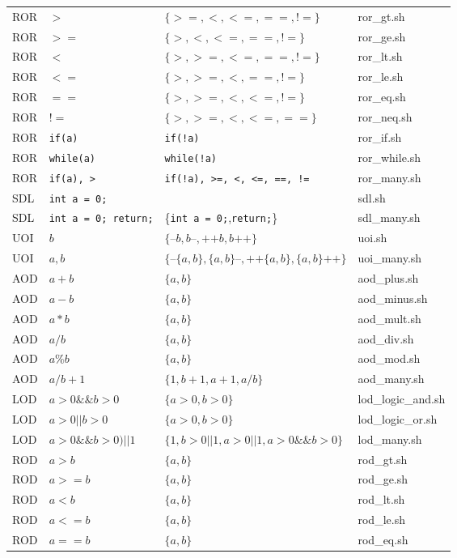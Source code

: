 \begin{table}[h]
\begin{tabular}{|llp{6cm}l|}
ROR	&	$>$	&	$\{>=, <, <=, ==, !=\}$	&	ror\_gt.sh \\
ROR	&	$>=$	&	$\{>, <, <=, ==, !=\}$	&	ror\_ge.sh \\
ROR	&	$<$	&	$\{>, >=, <=, ==, !=\}$	&	ror\_lt.sh \\
ROR	&	$<=$	&	$\{>, >=, <, ==, !=\}$	&	ror\_le.sh \\
ROR	&	$==$	&	$\{>, >=, <, <=, !=\}$	&	ror\_eq.sh \\
ROR	&	$!=$	&	$\{>, >=, <, <=, ==\}$	&	ror\_neq.sh \\
ROR	&	\texttt{if(a)}	&	\texttt{if(!a)}	&	ror\_if.sh \\
ROR	&	\texttt{while(a)}	&	\texttt{while(!a)}	&	ror\_while.sh \\
ROR	&	\texttt{if(a), >}	&	\texttt{if(!a), >=, <, <=, ==, !=}	&	ror\_many.sh \\
SDL	&	\texttt{int a = 0;} &	\texttt{}	&	sdl.sh \\
SDL	&	\texttt{int a = 0; return;} &	\{\texttt{int a = 0;},\texttt{return;}\}	&	sdl\_many.sh \\
UOI	&	$b$	&	$\{\texttt{--}b, b\texttt{--}, \texttt{++}b, b\texttt{++}\}$	&	uoi.sh \\
UOI	&	$a,b$	&	$\{\texttt{--}\{a,b\}, \{a,b\}\texttt{--}, \texttt{++}\{a,b\}, \{a,b\}\texttt{++}\}$	&	uoi\_many.sh \\
AOD	&	$a + b$	&	$\{a, b\}$	&	aod\_plus.sh \\
AOD	&	$a - b$	&	$\{a, b\}$	&	aod\_minus.sh \\
AOD	&	$a * b$	&	$\{a, b\}$	&	aod\_mult.sh \\
AOD	&	$a / b$	&	$\{a, b\}$	&	aod\_div.sh \\
AOD	&	$a \% b$	&	$\{a, b\}$	&	aod\_mod.sh \\
AOD	&	$a / b + 1$	&	$\{1, b+1, a+1, a/b\}$	&	aod\_many.sh \\
LOD	&	$a > 0 \&\& b > 0$	&	$\{a > 0, b > 0\}$	&	lod\_logic\_and.sh \\
LOD	&	$a > 0 || b > 0$	&	$\{a > 0, b > 0\}$	&	lod\_logic\_or.sh \\
LOD	&	$a > 0 \&\& b > 0) || 1$	&	$\{ 1, b>0 || 1, a > 0 || 1, a>0 \&\& b>0\}$	&	lod\_many.sh \\
ROD	&	$a>b$	&	$\{a, b\}$	&	rod\_gt.sh \\
ROD	&	$a>=b$	&	$\{a, b\}$	&	rod\_ge.sh \\
ROD	&	$a<b$	&	$\{a, b\}$	&	rod\_lt.sh \\
ROD	&	$a<=b$	&	$\{a, b\}$	&	rod\_le.sh \\
ROD	&	$a==b$	&	$\{a, b\}$	&	rod\_eq.sh \\

\end{tabular}
\end{table}
